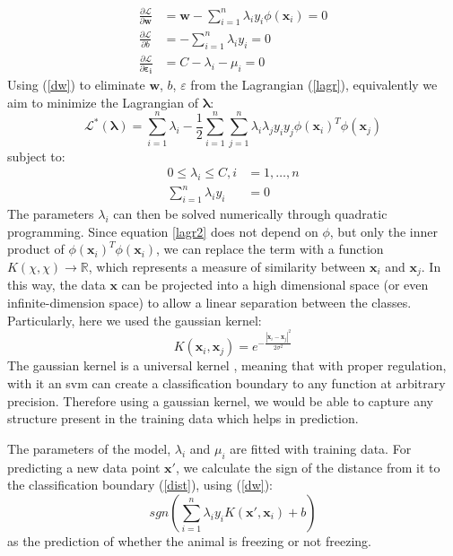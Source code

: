 \begin{align}\label{dw}
    \frac{\partial\mathcal{L}}{\partial\mathbf{w}} &= \mathbf{w} - \sum_{i=1}^n \lambda_i  y_i  \phi(\mathbf{x}_i) = 0 \\ 
    \frac{\partial\mathcal{L}}{\partial{b}} &= - \sum_{i=1}^n \lambda_i y_i = 0 \\
    \frac{\partial\mathcal{L}}{\partial{\mathbf{\varepsilon_i}}} &= C - \lambda_i - \mu_i = 0 
\end{align}
Using (\ref{dw}) to eliminate $\mathbf{w}$, $b$, $\varepsilon$ from the Lagrangian (\ref{lagr}), equivalently we aim to minimize the Lagrangian of $\mathbf{\lambda}$:
\begin{equation} \label{lagr2}
    \mathcal{L}^*(\mathbf{\lambda}) = \sum_{i=1}^{n} \lambda_i - \frac{1}{2}\sum_{i=1}^n \sum_{j=1}^n \lambda_i \lambda_j y_i y_j \phi(\mathbf{x}_i)^T\phi(\mathbf{x}_j)
\end{equation}
subject to:
\begin{align*}
    0 \leq \lambda_i \leq C, i &= 1,\ldots,n \\
    \sum_{i=1}^n \lambda_i y_i &= 0
\end{align*}
The parameters $\lambda_i$ can then be solved numerically through quadratic programming. Since equation \ref{lagr2} does not depend on $\phi$, but only the inner product of $\phi(\mathbf{x}_i)^T\phi(\mathbf{x}_i)$, we can replace the term with a function $K(\chi, \chi) \to \mathbb{R}$, which represents a measure of similarity between $\mathbf{x}_i$ and $ \mathbf{x}_j$. In this way, the data $\mathbf{x}$ can be projected into a high dimensional space (or even infinite-dimension space) to allow a linear separation between the classes. Particularly, here we used the gaussian kernel:
\begin{equation*}
    K(\mathbf{x}_i, \mathbf{x}_j) = e^{-\frac{|\mathbf{x}_i - \mathbf{x}_j|^2}{2\sigma^2}}
\end{equation*}
The gaussian kernel is a universal kernel , meaning that with proper regulation, with it an \gls{svm} can create a classification boundary to any function at arbitrary precision. Therefore using a gaussian kernel, we would be able to capture any structure present in the training data which helps in prediction.

The parameters of the model, $\lambda_i$ and $\mu_i$ are fitted with training data. For predicting a new data point $\mathbf{x}'$, we calculate the sign of the distance from it to the classification boundary (\ref{dist}), using (\ref{dw}):
\begin{equation*}
    sgn(\sum_{i=1}^n\lambda_iy_iK(\mathbf{x}', \mathbf{x}_i) + b)
\end{equation*}
as the prediction of whether the animal is freezing or not freezing.

